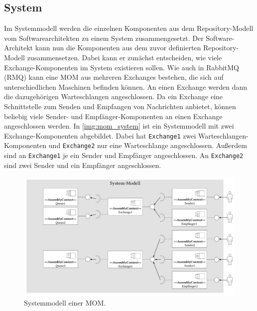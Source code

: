 \subsection{System}
Im Systemmodell werden die einzelnen Komponenten aus dem Repository-Modell vom Softwarearchitekten zu einem System zusammengesetzt. Der Software-Architekt kann nun die Komponenten aus dem zuvor definierten Repository-Modell zusammensetzen. Dabei kann er zunächst entscheiden, wie viele Exchange-Komponenten im System existieren sollen. Wie auch in RabbitMQ (RMQ) kann eine MOM aus mehreren Exchanges bestehen, die sich auf unterschiedlichen Maschinen befinden können. An einen Exchange werden dann die dazugehörigen Warteschlangen angeschlossen. Da ein Exchange eine Schnittstelle zum Senden und Empfangen von Nachrichten anbietet, können beliebig viele Sender- und Empfänger-Komponenten an einen Exchange angeschlossen werden. In \autoref{img:mom_system} ist ein Systemmodell mit zwei Exchange-Komponenten abgebildet. Dabei hat \texttt{Exchange1} zwei Warteschlangen-Komponenten und \texttt{Exchange2} nur eine Warteschlange angeschlossen. Außerdem sind an \texttt{Exchange1} je ein Sender und Empfänger angeschlossen. An \texttt{Exchange2} sind zwei Sender und ein Empfänger angeschlossen. 

\begin{figure}
\center
  \includegraphics[width=1.4\textwidth, angle=90]{images/modelling/modelingSystem.pdf}
  \caption{Systemmodell einer MOM.}
  \label{img:mom_system}
\end{figure}
